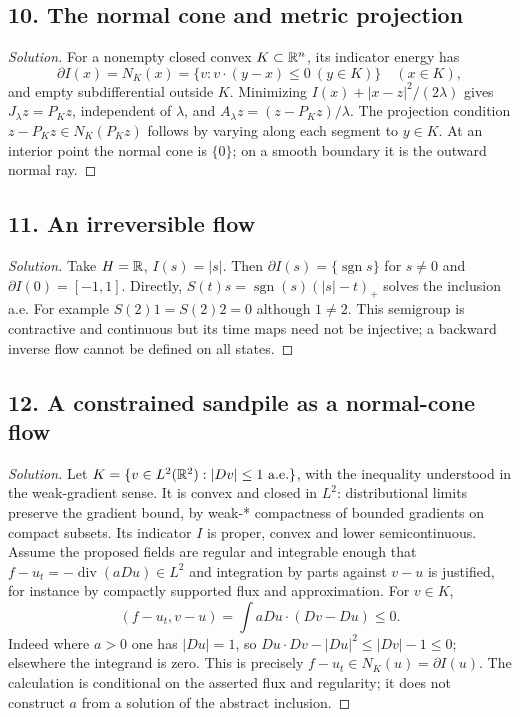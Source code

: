 \subsection*{10. The normal cone and metric projection}
\begin{proof}[Solution]
For a nonempty closed convex $K\subset\mathbb{R}^n$, its indicator energy has
\[
 \partial I(x)=N_K(x)=\{v:v\cdot(y-x)\leq0\ (y\in K)\}
 \quad(x\in K),
\]
and empty subdifferential outside $K$. Minimizing
$I(x)+|x-z|^2/(2\lambda)$ gives $J_\lambda z=P_Kz$, independent
of $\lambda$, and $A_\lambda z=(z-P_Kz)/\lambda$.
The projection condition $z-P_Kz\in N_K(P_Kz)$ follows by varying
along each segment to $y\in K$. At an interior point the normal cone
is $\{0\}$; on a smooth boundary it is the outward normal ray.
\end{proof}

\subsection*{11. An irreversible flow}
\begin{proof}[Solution]
Take $H=\mathbb{R}$, $I(s)=|s|$. Then $\partial I(s)=\{\operatorname{sgn}s\}$
for $s\ne0$ and $\partial I(0)=[-1,1]$. Directly,
$S(t)s=\operatorname{sgn}(s)(|s|-t)_+$ solves the inclusion a.e.
For example $S(2)1=S(2)2=0$ although $1\ne2$. This semigroup is
contractive and continuous but its time maps need not be injective;
a backward inverse flow cannot be defined on all states.
\end{proof}

\subsection*{12. A constrained sandpile as a normal-cone flow}
\begin{proof}[Solution]
Let $K=\{v\in L^2(\mathbb{R}^2):|Dv|\leq1\text{ a.e.}\}$, with the
inequality understood in the weak-gradient sense. It is convex and closed
in $L^2$: distributional limits preserve the gradient bound, by weak-*
compactness of bounded gradients on compact subsets. Its indicator $I$
is proper, convex and lower semicontinuous.
Assume the proposed fields are regular and integrable enough that
$f-u_t=-\operatorname{div}(aDu)\in L^2$ and integration by parts
against $v-u$ is justified, for instance by compactly supported flux
and approximation. For $v\in K$,
\[
 (f-u_t,v-u)=\int aDu\cdot(Dv-Du)\leq0.
\]
Indeed where $a>0$ one has $|Du|=1$, so
$Du\cdot Dv-|Du|^2\leq|Dv|-1\leq0$; elsewhere the integrand is zero.
This is precisely $f-u_t\in N_K(u)=\partial I(u)$.
The calculation is conditional on the asserted flux and regularity;
it does not construct $a$ from a solution of the abstract inclusion.
\end{proof}

